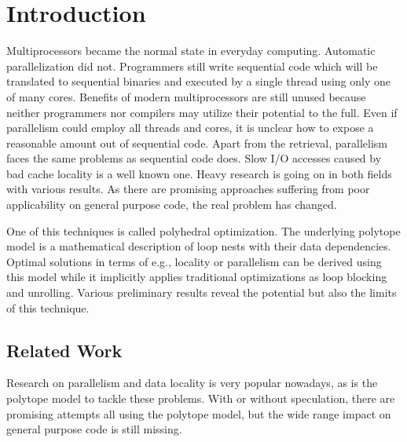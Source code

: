 
\chapter{Introduction} %
\label{Chapter1}


Multiprocessors became the normal state in everyday computing. Automatic
parallelization did not. Programmers still write sequential code which will be
translated to sequential binaries and executed by a single thread using only
one of many cores. %
Benefits of modern multiprocessors are still unused because neither programmers 
nor compilers may utilize their potential to the full. Even if parallelism could
employ all threads and cores, it is unclear how to expose a reasonable  
amount out of sequential code.
Apart from the retrieval, parallelism faces the same problems as sequential
code does. Slow I/O accesses caused by bad cache locality is a well known one. 
Heavy research is going on in both fields with various results. 
As there are promising approaches suffering from poor applicability on general 
purpose code, the real problem has changed. 

One of this techniques is called polyhedral optimization.
The underlying polytope model is a mathematical description of loop nests with 
their data dependencies. Optimal solutions in terms of e.g., locality or 
parallelism can be derived using this model while it implicitly applies 
traditional optimizations as loop blocking and unrolling. 
Various preliminary results reveal the potential but also the
limits of this technique.


\section{Related Work}
Research on parallelism and data locality is very popular nowadays, as is the 
polytope model to tackle these problems. With or without speculation, there are
promising attempts all using the polytope model, but the wide range 
impact on general purpose code is still missing.

